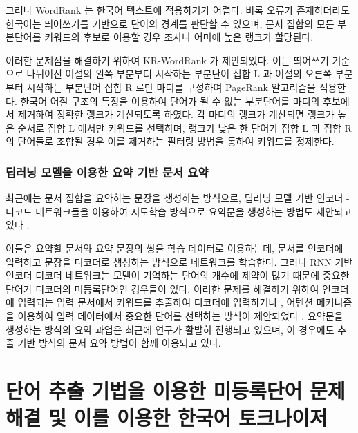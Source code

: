 \documentclass[11pt]{article}
\begin{document}
그러나 WordRank 는 한국어 텍스트에 적용하기가 어렵다.
비록 오류가 존재하더라도 한국어는 띄어쓰기를 기반으로 단어의 경계를 판단할 수 있으며, 문서 집합의 모든 부분단어를 키워드의 후보로 이용할 경우 조사나 어미에 높은 랭크가 할당된다.

이러한 문제점을 해결하기 위하여 KR-WordRank \citep{kim2014kr} 가 제안되었다.
이는 띄어쓰기 기준으로 나뉘어진 어절의 왼쪽 부분부터 시작하는 부분단어 집합 L 과 어절의 오른쪽 부분부터 시작하는 부분단어 집합 R 로만 마디를 구성하여 PageRank 알고리즘을 적용한다.
한국어 어절 구조의 특징을 이용하여 단어가 될 수 없는 부분단어를 마디의 후보에서 제거하여 정확한 랭크가 계산되도록 하였다.
각 마디의 랭크가 계산되면 랭크가 높은 순서로 집합 L 에서만 키워드를 선택하며, 랭크가 낮은 한 단어가 집합 L 과 집합 R 의 단어들로 조합될 경우 이를 제거하는 필터링 방법을 통하여 키워드를 정제한다.

\subsubsection{딥러닝 모델을 이용한 요약 기반 문서 요약}

최근에는 문서 집합을 요약하는 문장을 생성하는 방식으로, 딥러닝 모델 기반 인코더 - 디코드 네트워크들을 이용하여 지도학습 방식으로 요약문을 생성하는 방법도 제안되고 있다 \citep{rush2015neural}.

이들은 요약할 문서와 요약 문장의 쌍을 학습 데이터로 이용하는데, 문서를 인코더에 입력하고 문장을 디코더로 생성하는 방식으로 네트워크를 학습한다.
그러나 RNN 기반 인코더 디코더 네트워크는 모델이 기억하는 단어의 개수에 제약이 많기 때문에 중요한 단어가 디코더의 미등록단어인 경우들이 있다.
이러한 문제를 해결하기 위하여 인코더에 입력되는 입력 문서에서 키워드를 추출하여 디코더에 입력하거나 \citep{nallapati2016abstractive}, 어텐션 메커니즘을 이용하여 입력 데이터에서 중요한 단어를 선택하는 방식이 제안되었다 \citep{see2017get, gu2016incorporating}.
요약문을 생성하는 방식의 요약 과업은 최근에 연구가 활발히 진행되고 있으며, 이 경우에도 추출 기반 방식의 문서 요약 방법이 함께 이용되고 있다.



\newpage
\section{단어 추출 기법을 이용한 미등록단어 문제 해결 및 이를 이용한 한국어 토크나이저} \label{word_extraction}

\linenumbers
\modulolinenumbers[5]
\end{document}
